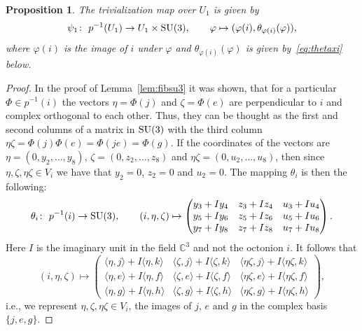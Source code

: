 \documentclass[pdftex]{sigma}
\numberwithin{equation}{section}
\newtheorem{Proposition}[Theorem]{Proposition}
 { \theoremstyle{definition}
\newtheorem{Definition}[Theorem]{Definition}
\newtheorem{Remark}[Theorem]{Remark} }
\newcommand{\SC}{\mathbb{C}} %
\begin{document}
\begin{Proposition} \label{prop:trivn} The trivialization map over $U_1$ is given by
 \[\psi_1\colon \ p^{-1}(U_1) \rightarrow U_1 \times {\rm SU}(3), \qquad \varphi \mapsto (\varphi(i),\theta_{\varphi(i)}(\varphi) ),\]
 where $\varphi(i)$ is the image of $i$ under $\varphi$ and $\theta_{\varphi(i)}(\varphi)$ is given by~\eqref{eq:thetaxi} below.
\end{Proposition}
\begin{proof}In the proof of Lemma~\ref{lem:fibsu3} it was shown, that
 for a particular $\Phi \in p^{-1}(i)$ the vectors $\eta=\Phi(j)$ and $\zeta=\Phi(e)$ are perpendicular to $i$ and complex orthogonal to each other. Thus, they can be thought as the first and second columns of a matrix in ${\rm SU}(3)$ with the third column $\eta\zeta=\Phi(j)\Phi(e)=\Phi(je)=\Phi(g)$. %
 If the coordinates of the vectors are $\eta=(0,y_2,\dots,y_8)$, $\zeta=(0,z_2,\dots,z_8)$ and $\eta \zeta = (0,u_2,\dots,u_8)$, then since $\eta,\zeta,\eta\zeta \in V_i$ we have that $y_2=0$, $z_2=0$ and $u_2=0$. The mapping $\theta_{i}$ is then the following:
 \[\theta_i\colon \ p^{-1}(i) \rightarrow {\rm SU}(3), \qquad (i,\eta,\zeta) \mapsto
 \begin{pmatrix}
 y_3+Iy_4 & z_3+Iz_4 & u_3+Iu_4\\
 y_5+Iy_6 & z_5+Iz_6 & u_5+Iu_6\\
 y_7+Iy_8 & z_7+Iz_8 & u_7+Iu_8
 \end{pmatrix}.\]
 Here $I$ is the imaginary unit in the field $\SC^3$ and not the octonion $i$.
 It follows that
 \[ (i,\eta,\zeta) \mapsto
 \begin{pmatrix}
 \langle \eta,j \rangle + I\langle \eta,k \rangle & \langle \zeta,j \rangle + I\langle \zeta,k \rangle & \langle \eta \zeta,j \rangle + I\langle \eta \zeta,k \rangle\\
 \langle \eta,e \rangle +I\langle \eta,f \rangle & \langle \zeta,e \rangle +I\langle \zeta,f \rangle & \langle \eta \zeta,e \rangle +I\langle \eta \zeta,f \rangle\\
 \langle \eta,g \rangle +I\langle \eta,h \rangle & \langle \zeta,g \rangle +I\langle \zeta,h \rangle & \langle \eta \zeta,g \rangle +I\langle \eta \zeta,h \rangle
 \end{pmatrix},
 \]
 i.e., we represent $\eta,\zeta,\eta\zeta \in V_i$, the images of $j$, $e$ and $g$ in the complex basis $\{j,e,g\}$.


\end{proof}
\end{document}
